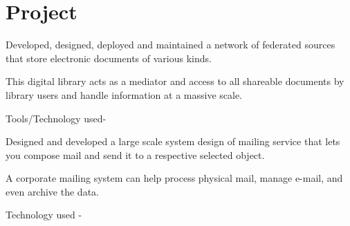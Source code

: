 \documentclass[]{mmynayak-resume-openfont}
\begin{document}
\hfill
\begin{minipage}[t]{0.66\textwidth} 

\textbullet{}
\textbullet{}
\textbullet{}


\section{Project}
\vspace{\topsep} %
\begin{tightemize}
\item Developed, designed, deployed and maintained a
network of federated sources that store electronic
documents of various kinds.
\item This digital library acts as a mediator and access to all
shareable documents by library users and handle
information at a massive scale. 
\item Tools/Technology used- 
\item {}
\end{tightemize}
\sectionsep

\begin{tightemize}
\item Designed and developed a large scale system design of
mailing service that lets you compose mail and send it
to a respective selected object.
\item A corporate mailing system can help process physical
mail, manage e-mail, and even archive the data.
\item Technology used - 
\item {}
\end{tightemize}
\sectionsep


\end{minipage}
\end{document}
